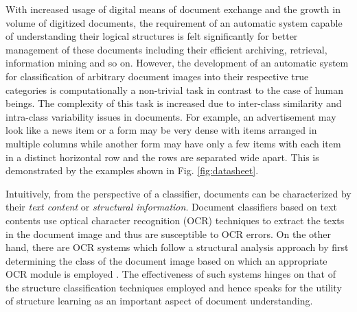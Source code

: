 \documentclass[10pt,conference,a4paper]{IEEEtran}
\begin{document}
With increased usage of digital means of document exchange and the growth in volume of digitized documents, the requirement of an automatic system capable of understanding their logical structures is felt significantly for better management of these documents including their efficient archiving, retrieval, information mining and so on. However, the development of an automatic system for classification of arbitrary document images into their respective true categories is computationally a non-trivial task in contrast to the case of human beings. The complexity of this task is increased due to inter-class similarity and intra-class variability issues in documents. For example, an advertisement may look like a news item or a form may be very dense with items arranged in multiple columns while another form may have only a few items with each item in a distinct horizontal row and the rows are separated wide apart. This is demonstrated by the examples shown in Fig. \ref{fig:datasheet}.


Intuitively, from the perspective of a classifier, documents can be characterized by their \textit{text content} or \textit{structural information}\cite{chen2007}. Document classifiers based on text contents use optical character recognition (OCR) techniques to extract the texts in the document image and thus are susceptible to OCR errors. On the other hand, there are OCR systems which follow a structural analysis approach by first determining the class of the document image based on which an appropriate OCR module is employed \cite{appiani2001}. The effectiveness of such systems hinges on that of the structure classification techniques employed and hence speaks for the utility of structure learning as an important aspect of document understanding.
\end{document}
